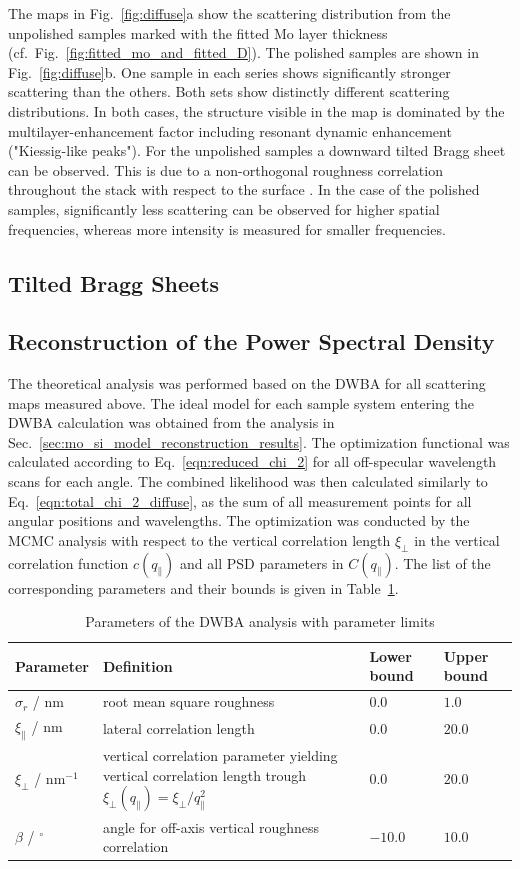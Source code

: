 The maps in Fig.~\ref{fig:diffuse}a show the scattering distribution from the unpolished samples marked with the fitted Mo layer thickness (cf.~Fig.~\ref{fig:fitted_mo_and_fitted_D}). The polished samples are shown in Fig.~\ref{fig:diffuse}b. One sample in each series shows significantly stronger scattering than the others. Both sets show distinctly different scattering distributions. In both cases, the structure visible in the map is dominated by the multilayer-enhancement factor including resonant dynamic enhancement ("Kiessig-like peaks")\cite{haase_role_2014}. For the unpolished samples a downward tilted Bragg sheet can be observed. This is due to a non-orthogonal roughness correlation throughout the stack with respect to the surface \cite{gullikson_asymmetric_1999}. In the case of the polished samples, significantly less scattering can be observed for higher spatial frequencies, whereas more intensity is measured for smaller frequencies.


\subsection{Tilted Bragg Sheets}

\subsection{Reconstruction of the Power Spectral Density}
The theoretical analysis was performed based on the DWBA for all scattering maps measured above. The ideal model for each sample system entering the DWBA calculation was obtained from the analysis in Sec.~\ref{sec:mo_si_model_reconstruction_results}. The optimization functional was calculated according to Eq.~\eqref{eqn:reduced_chi_2} for all off-specular wavelength scans for each angle. The combined likelihood was then calculated similarly to Eq.~\eqref{eqn:total_chi_2_diffuse}, as the sum of all measurement points for all angular positions and wavelengths. The optimization was conducted by the MCMC analysis with respect to the vertical correlation length $\xi_\perp$ in the vertical correlation function $c(q_\parallel)$ and all PSD parameters in $C(q_\parallel)$. The list of the corresponding parameters and their bounds is given in Table~\ref{tbl:diffuse_parameters}.
\begin{table}
\centering
\caption{Parameters of the DWBA analysis with parameter limits}
\label{tbl:diffuse_parameters}
\begin{tabularx}{\textwidth}{@{}lXll@{}}
\toprule
Parameter & Definition & Lower bound & Upper bound\\ \midrule
$\sigma_r$ / nm & root mean square roughness & $0.0$& $1.0$\\ 
$\xi_\parallel$ / nm & lateral correlation length & $0.0$& $20.0$\\ 
$\xi_\perp$ / nm$^{-1}$ &vertical correlation parameter yielding vertical correlation length trough $\xi_\perp(q_\parallel) = \xi_\perp/q_\parallel^2$ &$0.0$ & $20.0$\\
$\beta$ / $^\circ$&angle for off-axis vertical roughness correlation& $-10.0$ & $10.0$\\ 
 \bottomrule
\end{tabularx}
\end{table}

